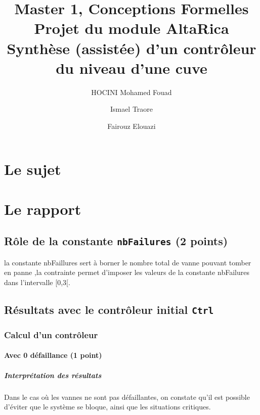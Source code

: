 \documentclass[a4paper]{book}
\newcommand{\altarica}{{\sc AltaRica}}
\begin{document}
\title{Master 1, Conceptions Formelles\\
Projet du module \altarica\\
Synthèse (assistée) d'un contrôleur du niveau d'une cuve}

\date{}

\author{HOCINI Mohamed Fouad \and Ismael Traore \and Fairouz Elouazi}

\maketitle

\chapter{Le sujet}


\chapter{Le rapport}
\section{Rôle de la constante {\tt nbFailures} (2 points)}
la constante nbFaillures sert à borner le nombre total de vanne pouvant tomber en panne ,la contrainte permet d'imposer les valeurs de la constante nbFailures dans l'intervalle 
[0,3[.
\section{Résultats avec le contrôleur initial {\tt Ctrl}}

\subsection{Calcul d'un contrôleur}

\subsubsection{Avec 0 défaillance (1 point)}





\paragraph{Interprétation des résultats}
Dans le cas où les vannes ne sont pas défaillantes, on constate qu'il est possible d'éviter que le système se bloque, ainsi que les situations critiques.
\end{document}
